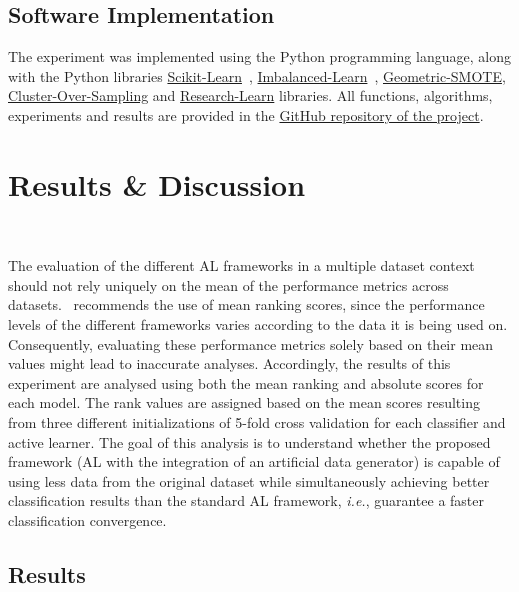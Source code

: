 \documentclass[remotesensing,article,submit,moreauthors,pdftex]{Definitions/mdpi}
\begin{document}
\begin{paracol}{2}
\subsection{Software Implementation}

The experiment was implemented using the Python programming language, along
with the Python libraries
\href{https://scikit-learn.org/stable/}{Scikit-Learn}~\cite{Pedregosa2011},
\href{https://imbalanced-learn.org/en/stable/}{Imbalanced-Learn}~\cite{JMLR:v18:16-365},
\href{https://geometric-smote.readthedocs.io/en/latest/?badge=latest}{Geometric-SMOTE},
\href{https://cluster-over-sampling.readthedocs.io/en/latest/?badge=latest}{Cluster-Over-Sampling}
and
\href{https://research-learn.readthedocs.io/en/latest/?badge=latest}{Research-Learn}
libraries. All functions, algorithms, experiments and results are provided in
the \href{https://github.com/joaopfonseca/research/}{GitHub repository of the
project}.

\section{Results \& Discussion}~\label{sec:results}

The evaluation of the different AL frameworks in a multiple dataset context
should not rely uniquely on the mean of the performance metrics across
datasets.~\cite{demvsar2006} recommends the use of mean ranking scores, since
the performance levels of the different frameworks varies according to the
data it is being used on. Consequently, evaluating these performance metrics
solely based on their mean values might lead to inaccurate analyses.
Accordingly, the results of this experiment are analysed using both the mean
ranking and absolute scores for each model. The rank values are assigned based
on the mean scores resulting from three different initializations of 5-fold
cross validation for each classifier and active learner. The goal of this
analysis is to understand whether the proposed framework (AL with the
integration of an artificial data generator) is capable of using less data
from the original dataset while simultaneously achieving better classification
results than the standard AL framework, \textit{i.e.}, guarantee a faster
classification convergence. 

\subsection{Results}~\label{sec:sub_results}


\end{paracol}
\end{document}
